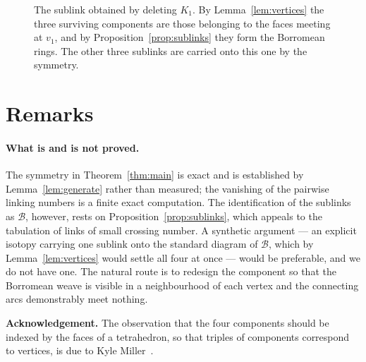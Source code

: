 \documentclass[11pt,a4paper]{article}
\theoremstyle{plain}
\theoremstyle{definition}
\newcommand{\Bor}{\mathcal{B}}
\begin{document}
\begin{figure}[htbp]
\centering

\caption{The sublink obtained by deleting \textcolor{ringA}{$K_1$}. By
Lemma~\ref{lem:vertices} the three surviving
components are those belonging to the faces meeting at $v_1$, and by
Proposition~\ref{prop:sublinks} they form the Borromean rings. The other three
sublinks are carried onto this one by the symmetry.}
\label{fig:sublink}
\end{figure}

\section{Remarks}\label{sec:remarks}

\paragraph{What is and is not proved.}
The symmetry in Theorem~\ref{thm:main} is exact and is established by
Lemma~\ref{lem:generate} rather than measured; the vanishing of the pairwise
linking numbers is a finite exact computation. The identification of the
sublinks as $\Bor$, however, rests on Proposition~\ref{prop:sublinks}, which
appeals to the tabulation of links of small crossing number. A synthetic
argument --- an explicit isotopy carrying one sublink onto the standard diagram
of $\Bor$, which by Lemma~\ref{lem:vertices} would settle all four at once ---
would be preferable, and we do not have one. The natural route is to redesign the component so that the Borromean
weave is visible in a neighbourhood of each vertex and the connecting arcs
demonstrably meet nothing.

\bigskip
\noindent\textbf{Acknowledgement.} The observation that the four components
should be indexed by the faces of a tetrahedron, so that triples of components
correspond to vertices, is due to Kyle Miller~\cite{miller2018}.



\end{document}
